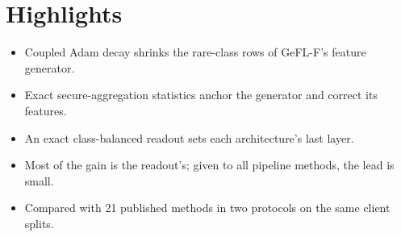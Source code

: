 \documentclass[12pt]{article}
\begin{document}
\section*{Highlights}
\begin{itemize}
\item Coupled Adam decay shrinks the rare-class rows of GeFL-F's feature generator.
\item Exact secure-aggregation statistics anchor the generator and correct its features.
\item An exact class-balanced readout sets each architecture's last layer.
\item Most of the gain is the readout's; given to all pipeline methods, the lead is small.
\item Compared with 21 published methods in two protocols on the same client splits.
\end{itemize}
\end{document}
